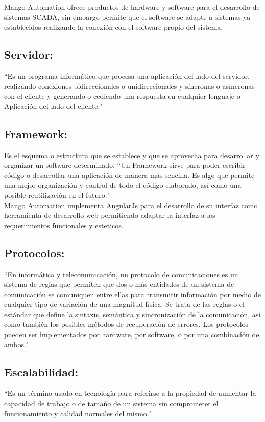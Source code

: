     Mango Automation ofrece productos de hardware y software para el desarrollo de sistemas SCADA, sin embargo permite que 
    el software se adapte a sistemas ya establecidos realizando la conexión con el software propio del sistema. 

\subsection{Servidor:}
    ``Es un programa informático que procesa una aplicación del lado del servidor, realizando conexiones bidireccionales o unidireccionales y síncronas o asíncronas con el cliente y generando o cediendo una respuesta en cualquier lenguaje o Aplicación del lado del cliente."\textcolor{blue}{\cite{Servidor}}
    
\subsection{Framework:} 
    Es el esquema o estructura que se establece y que se aprovecha para desarrollar y organizar un software determinado.
    ``Un Framework sirve para poder escribir código o desarrollar una aplicación de manera más sencilla. Es algo que permite una mejor organización y control de todo el código elaborado, así como una posible reutilización en el futuro."\textcolor{blue}{\cite{Framework}}
    \\
    Mango Automation implementa AngularJs para el desarrollo de su interfaz como herramienta de desarrollo web permitiendo
    adaptar la interfaz a los requerimientos funcionales y esteticos.
\subsection{Protocolos:} ``En informática y telecomunicación, un protocolo de comunicaciones es un sistema de reglas que permiten que dos o más entidades de un sistema de comunicación se comuniquen entre ellas para transmitir información por medio de cualquier tipo de variación de una magnitud física. Se trata de las reglas o el estándar que define la sintaxis, semántica y sincronización de la comunicación, así como también los posibles métodos de recuperación de errores. Los protocolos pueden ser implementados por hardware, por software, o por una combinación de ambos."\textcolor{blue}{\cite{Protocolo}}
	
\subsection{Escalabilidad:} ``Es un término usado en tecnología para referirse a la propiedad de aumentar la capacidad de trabajo o de tamaño de un sistema sin comprometer el funcionamiento y calidad normales del mismo."\textcolor{blue}{\cite{escalabilidad}}
	
